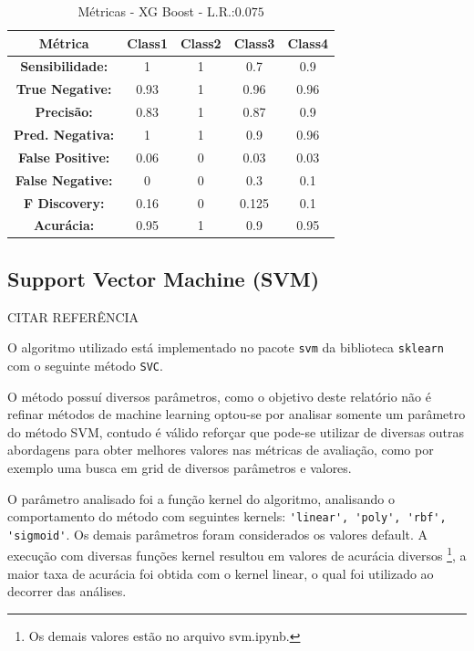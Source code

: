 \documentclass[
	article,			%
	11pt,				%
	oneside,			%
	a4paper,			%
	english,			%
	brazil,				%
	sumario=tradicional
	]{abntex2}
\begin{document}
\begin{table}[]
\centering
\begin{tabular}{|c|c|c|c|c|}
\hline
\textbf{Métrica}         & \textbf{Class1} & \textbf{Class2} & \textbf{Class3} & \textbf{Class4} \\ \hline
\textbf{Sensibilidade:}  & 1               & 1               & 0.7             & 0.9             \\ \hline
\textbf{True Negative:}  & 0.93            & 1               & 0.96            & 0.96            \\ \hline
\textbf{Precisão:}       & 0.83            & 1               & 0.87            & 0.9             \\ \hline
\textbf{Pred. Negativa:} & 1               & 1               & 0.9             & 0.96            \\ \hline
\textbf{False Positive:} & 0.06            & 0               & 0.03            & 0.03            \\ \hline
\textbf{False Negative:} & 0               & 0               & 0.3             & 0.1             \\ \hline
\textbf{F Discovery:}    & 0.16            & 0               & 0.125           & 0.1             \\ \hline
\textbf{Acurácia:}       & 0.95            & 1               & 0.9             & 0.95            \\ \hline
\end{tabular}
\caption{Métricas - XG Boost - L.R.:$0.075$}
\label{tab:metrics_xgb}
\end{table}

\subsection{Support Vector Machine (SVM)}

CITAR REFERÊNCIA

O algoritmo utilizado está implementado no pacote \verb|svm| da biblioteca \verb|sklearn| com o seguinte método \verb|SVC|. 

O método possuí diversos parâmetros, como o objetivo deste relatório não é refinar métodos de machine learning optou-se por analisar somente um parâmetro do método SVM, contudo é válido reforçar que pode-se utilizar de diversas outras abordagens para obter melhores valores nas métricas de avaliação, como por exemplo uma busca em grid de diversos parâmetros e valores.

O parâmetro analisado foi a função kernel do algoritmo, analisando o comportamento do método com seguintes kernels: \verb|'linear', 'poly', 'rbf', 'sigmoid'|. Os demais parâmetros foram considerados os valores default. A execução com diversas funções kernel resultou em valores de acurácia diversos 
\footnote{Os demais valores estão no arquivo svm.ipynb.}, a maior taxa de acurácia foi obtida com o kernel linear, o qual foi utilizado ao decorrer das análises. 
\end{document}
